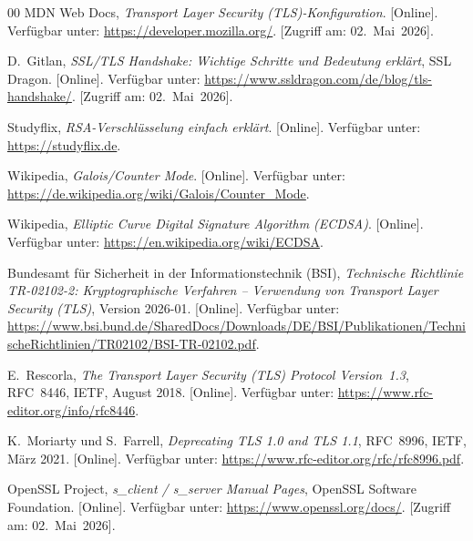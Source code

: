 \begin{thebibliography}{00}
  MDN Web Docs,
  \textit{Transport Layer Security (TLS)-Konfiguration}.
  [Online]. Verfügbar unter: \url{https://developer.mozilla.org/}.
  [Zugriff am: 02.~Mai~2026].

  D.~Gitlan,
  \textit{SSL/TLS Handshake: Wichtige Schritte und Bedeutung erklärt},
  SSL Dragon.
  [Online]. Verfügbar unter:
  \url{https://www.ssldragon.com/de/blog/tls-handshake/}.
  [Zugriff am: 02.~Mai~2026].

  Studyflix,
  \textit{RSA-Verschlüsselung einfach erklärt}.
  [Online]. Verfügbar unter: \url{https://studyflix.de}.

  Wikipedia,
  \textit{Galois/Counter Mode}.
  [Online]. Verfügbar unter:
  \url{https://de.wikipedia.org/wiki/Galois/Counter_Mode}.

  Wikipedia,
  \textit{Elliptic Curve Digital Signature Algorithm (ECDSA)}.
  [Online]. Verfügbar unter: \url{https://en.wikipedia.org/wiki/ECDSA}.

  Bundesamt für Sicherheit in der Informationstechnik (BSI),
  \textit{Technische Richtlinie TR-02102-2: Kryptographische
  Verfahren -- Verwendung von Transport Layer Security (TLS)},
  Version 2026-01.
  [Online]. Verfügbar unter:
  \url{https://www.bsi.bund.de/SharedDocs/Downloads/DE/BSI/Publikationen/TechnischeRichtlinien/TR02102/BSI-TR-02102.pdf}.

  E.~Rescorla,
  \textit{The Transport Layer Security (TLS) Protocol Version~1.3},
  RFC~8446, IETF, August 2018.
  [Online]. Verfügbar unter: \url{https://www.rfc-editor.org/info/rfc8446}.

  K.~Moriarty und S.~Farrell,
  \textit{Deprecating TLS 1.0 and TLS 1.1},
  RFC~8996, IETF, März 2021.
  [Online]. Verfügbar unter:
  \url{https://www.rfc-editor.org/rfc/rfc8996.pdf}.

  OpenSSL Project,
  \textit{s\_client / s\_server Manual Pages},
  OpenSSL Software Foundation.
  [Online]. Verfügbar unter: \url{https://www.openssl.org/docs/}.
  [Zugriff am: 02.~Mai~2026].


\end{thebibliography}
